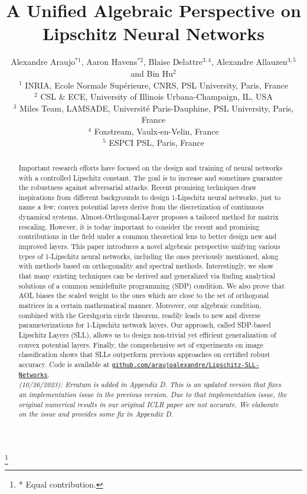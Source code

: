 \documentclass{article} \usepackage{iclr2023_conference,times}
\title{A Unified Algebraic Perspective on \\ Lipschitz Neural Networks}
\author{Alexandre Araujo$^{*1}$, Aaron Havens$^{*2}$, Blaise Delattre$^{3,4}$, Alexandre Allauzen$^{3,5}$ and Bin Hu$^2$ \\[0.2cm]
$^1$ INRIA, Ecole Normale Supérieure, CNRS, PSL University, Paris, France \\
$^2$ CSL \& ECE, University of Illinois Urbana-Champaign, IL, USA \\
$^3$ Miles Team, LAMSADE, Université Paris-Dauphine, PSL University, Paris, France \\
$^4$ Foxstream, Vaulx-en-Velin, France \\
$^5$ ESPCI PSL, Paris, France
}
\newcommand{\0}{\mathbf{0} }
\newcommand\blfootnote[1]{\begingroup
  \renewcommand\thefootnote{}\footnote{#1}\addtocounter{footnote}{-1}\endgroup
}
\begin{document}
\maketitle
\blfootnote{* Equal contribution.}

\begin{abstract}
Important research efforts have focused on the design and training of neural networks with a controlled Lipschitz constant. The goal is to increase and sometimes guarantee the robustness against adversarial attacks. Recent promising techniques draw inspirations from different backgrounds to design 1-Lipschitz neural networks, just to name a few: convex potential layers derive from the discretization of continuous dynamical systems, Almost-Orthogonal-Layer proposes a tailored method for matrix rescaling.  However, it is today important to consider the recent and promising contributions in the field under a common theoretical lens to better design new and improved layers. This paper introduces a novel algebraic perspective unifying various types of 1-Lipschitz neural networks, including the ones previously mentioned, along with methods based on orthogonality and spectral methods. Interestingly, we show that many existing techniques can be derived and generalized via finding analytical solutions of a common semidefinite programming (SDP) condition.  We also prove that AOL biases the scaled weight to the ones which are close to the set of orthogonal matrices in a certain mathematical manner. Moreover, our algebraic condition, combined with the Gershgorin circle theorem, readily leads to new and diverse parameterizations for 1-Lipschitz network layers. Our approach, called SDP-based Lipschitz Layers (SLL), allows us to design non-trivial yet efficient generalization of convex potential layers.  Finally, the comprehensive set of experiments on image classification shows that SLLs outperform previous approaches on  certified robust accuracy. Code is available at \href{https://github.com/araujoalexandre/Lipschitz-SLL-Networks}{\texttt{github.com/araujoalexandre/Lipschitz-SLL-Networks}}. \\[0.2cm]
\emph{(10/26/2023): Erratum is added in Appendix D. This is an updated version that fixes an implementation issue in the previous version. Due to that implementation issue, the original numerical results in our original ICLR paper are not accurate. We elaborate on the issue and provides some fix in Appendix D.
}
\end{abstract}
\end{document}
